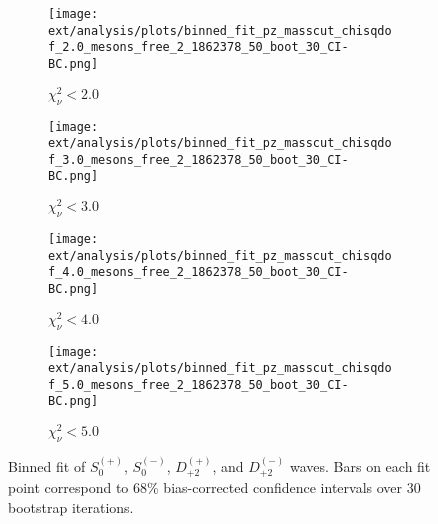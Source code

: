\begin{figure}[htbp]
    \centering
    \begin{subfigure}{0.45\textwidth}
        \texttt{[image: ext/analysis/plots/binned\_fit\_pz\_masscut\_chisqdof\_2.0\_mesons\_free\_2\_1862378\_50\_boot\_30\_CI-BC.png]}
        \caption{$\chi^2_\nu < 2.0$}
    \end{subfigure}
    \hfill
    \begin{subfigure}{0.45\textwidth}
        \texttt{[image: ext/analysis/plots/binned\_fit\_pz\_masscut\_chisqdof\_3.0\_mesons\_free\_2\_1862378\_50\_boot\_30\_CI-BC.png]}
        \caption{$\chi^2_\nu < 3.0$}
    \end{subfigure}
    \vspace{1em}
    \begin{subfigure}{0.45\textwidth}
        \texttt{[image: ext/analysis/plots/binned\_fit\_pz\_masscut\_chisqdof\_4.0\_mesons\_free\_2\_1862378\_50\_boot\_30\_CI-BC.png]}
        \caption{$\chi^2_\nu < 4.0$}
    \end{subfigure}
    \hfill
    \begin{subfigure}{0.45\textwidth}
        \texttt{[image: ext/analysis/plots/binned\_fit\_pz\_masscut\_chisqdof\_5.0\_mesons\_free\_2\_1862378\_50\_boot\_30\_CI-BC.png]}
        \caption{$\chi^2_\nu < 5.0$}
    \end{subfigure}

    \caption{Binned fit of $S_{0}^{(+)}$, $S_{0}^{(-)}$, $D_{+2}^{(+)}$, and $D_{+2}^{(-)}$ waves. Bars on each fit point correspond to $68\%$ bias-corrected confidence intervals over $ 30 $ bootstrap iterations.}
    \label{fig:binned-fit-all-Spn-D2pn}
\end{figure}


